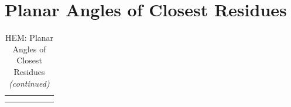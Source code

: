 \documentclass[a4paper, nobind]{templates/ociamthesis}
\begin{document}
\hypertarget{planar-angles-of-closest-residues}{%
\section{Planar Angles of Closest Residues}\label{planar-angles-of-closest-residues}}

\begin{longtabu} to 
\caption{\label{tab:HEM-t-planarClosest}HEM: Planar Angles of Closest Residues}\\
\toprule
{} &  &  &  &  & \\
\midrule
\endfirsthead
\caption[]{\label{tab:HEM-t-planarClosest}HEM: Planar Angles of Closest Residues \textit{(continued)}}\\
\toprule
{} &  &  &  &  & \\
\midrule
\endhead


\end{longtabu}
\end{document}
